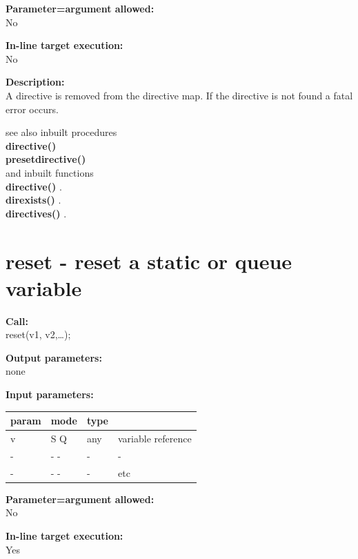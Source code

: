         {\bf Parameter=argument allowed:} \\
        No
        
        {\bf In-line target execution:} \\
        No
        
        {\bf Description:} \\
        A directive is removed from the directive map. If the directive
        is not found a fatal error occurs.
        
        see also inbuilt procedures \\
        {\bf directive()}  \\
        {\bf presetdirective()}  \\
        and inbuilt functions \\
        {\bf directive()} .\\
        {\bf direxists()} .\\
        {\bf directives()} .


    \section{reset - reset a static or queue variable}\label{sec:ipreset}
        
        {\bf Call:} \\
        reset(v1, v2,\dots);
        
        {\bf Output parameters:} \\
        none
        
        {\bf Input parameters:} \\
        \begin{tabular}{| l | l | l | l |}
        \hline
        param & mode & type & \\
        \hline \hline
        v & S Q & any & variable reference      \\ \hline
        - & - - &  -  & -                       \\ \hline
        - & - - &  -  & etc                     \\ \hline
        \end{tabular}
        
        {\bf Parameter=argument allowed:} \\
        No
        
        {\bf In-line target execution:} \\
        Yes
        
